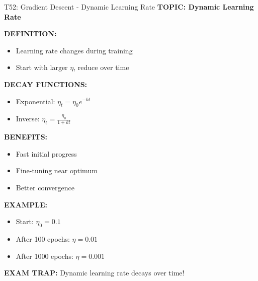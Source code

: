 \documentclass[8pt]{beamer}
\begin{document}
	\begin{frame}{T52: Gradient Descent - Dynamic Learning Rate}
		\fontsize{6.5}{7.5}\selectfont
		\textbf{TOPIC: Dynamic Learning Rate}
		
		\vspace{0.1cm}
		\textbf{DEFINITION:}
		\begin{itemize}
			\item Learning rate changes during training
			\item Start with larger $\eta$, reduce over time
		\end{itemize}
		
		\vspace{0.1cm}
		\textbf{DECAY FUNCTIONS:}
		\begin{itemize}
			\item Exponential: $\eta_t = \eta_0 e^{-kt}$
			\item Inverse: $\eta_t = \frac{\eta_0}{1 + kt}$
		\end{itemize}
		
		\vspace{0.1cm}
		\textbf{BENEFITS:}
		\begin{itemize}
			\item Fast initial progress
			\item Fine-tuning near optimum
			\item Better convergence
		\end{itemize}
		
		\vspace{0.1cm}
		\textbf{EXAMPLE:}
		\begin{itemize}
			\item Start: $\eta_0 = 0.1$
			\item After 100 epochs: $\eta = 0.01$
			\item After 1000 epochs: $\eta = 0.001$
		\end{itemize}
		
		\textcolor{myred}{\textbf{EXAM TRAP:}} Dynamic learning rate \textcolor{myblue}{decays} over time!
	\end{frame}
	
\end{document}
